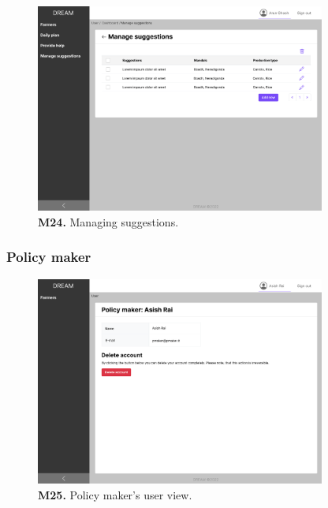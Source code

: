 \begin{figure}[H]
    \centering
    \includegraphics[width=0.85\textwidth]{mockups/Agronomist_Dashboard_Manage suggestions.png}
    \caption{\textbf{M24.} Managing suggestions.}
\end{figure}

\subsubsection{Policy maker}

\begin{figure}[H]
    \centering
    \includegraphics[width=0.85\textwidth]{mockups/Policy maker_User.png}
    \caption{\textbf{M25.} Policy maker's user view.}
\end{figure}

